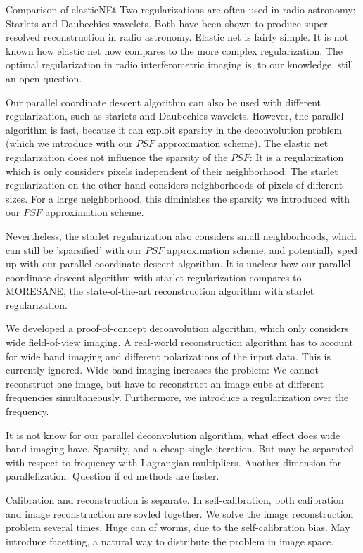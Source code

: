Comparison of elasticNEt
Two regularizations are often used in radio astronomy: Starlets \cite{starck2015starlet} and Daubechies wavelets\cite{carrillo2014purify}. Both have been shown to produce super-resolved reconstruction in radio astronomy\cite{dabbech2015moresane, dabbech2018cygnus}. Elastic net is fairly simple. It is not known how elastic net now compares to the more complex regularization.
The optimal regularization in radio interferometric imaging is, to our knowledge, still an open question. 

Our parallel coordinate descent algorithm can also be used with different regularization, such as starlets and Daubechies wavelets. However, the parallel algorithm is fast, because it can exploit sparsity in the deconvolution problem (which we introduce with our $PSF$ approximation scheme). The elastic net regularization does not influence the sparsity of the $PSF$: It is a regularization which is only considers pixels independent of their neighborhood. The starlet regularization on the other hand considers neighborhoods of pixels of different sizes. For a large neighborhood, this diminishes the sparsity we introduced with our $PSF$ approximation scheme.  

Nevertheless, the starlet regularization also considers small neighborhoods, which can still be 'sparsified' with our $PSF$ approximation scheme, and potentially sped up with our parallel coordinate descent algorithm. It is unclear how our parallel coordinate descent algorithm with starlet regularization compares to MORESANE, the state-of-the-art reconstruction algorithm with starlet regularization.

We developed a proof-of-concept deconvolution algorithm, which only considers wide field-of-view imaging. A real-world reconstruction algorithm has to account for wide band imaging and different polarizations of the input data. This is currently ignored. Wide band imaging increases the problem: We cannot reconstruct one image, but have to reconstruct an image cube at different frequencies simultaneously. Furthermore, we introduce a regularization over the frequency.

It is not know for our parallel deconvolution algorithm, what effect does wide band imaging have. 
Sparsity, and a cheap single iteration.
But may be separated with respect to frequency with Lagrangian multipliers. Another dimension for parallelization. 
Question if cd methods are faster.

Calibration and reconstruction is separate. In self-calibration, both calibration and image reconstruction are sovled together. We solve the image reconstruction problem several times.
Huge can of worms, due to the self-calibration bias.
May introduce facetting, a natural way to distribute the problem in image space.

